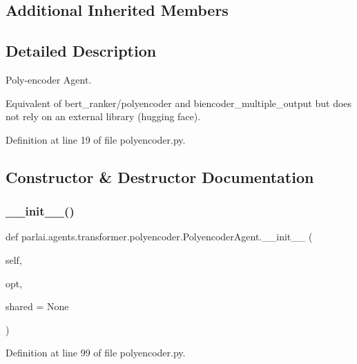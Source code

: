 \subsection*{Additional Inherited Members}


\subsection{Detailed Description}
\begin{DoxyVerb}Poly-encoder Agent.

Equivalent of bert_ranker/polyencoder and biencoder_multiple_output but does not
rely on an external library (hugging face).
\end{DoxyVerb}
 

Definition at line 19 of file polyencoder.\+py.



\subsection{Constructor \& Destructor Documentation}
\mbox{\label{classparlai_1_1agents_1_1transformer_1_1polyencoder_1_1PolyencoderAgent_a2e8f1aca19a3ba34386d7c69ed7e17bc}} 
\subsubsection{\texorpdfstring{\+\_\+\+\_\+init\+\_\+\+\_\+()}{\_\_init\_\_()}}
{\footnotesize\ttfamily def parlai.\+agents.\+transformer.\+polyencoder.\+Polyencoder\+Agent.\+\_\+\+\_\+init\+\_\+\+\_\+ (\begin{DoxyParamCaption}\item[{}]{self,  }\item[{}]{opt,  }\item[{}]{shared = {\ttfamily None} }\end{DoxyParamCaption})}



Definition at line 99 of file polyencoder.\+py.


